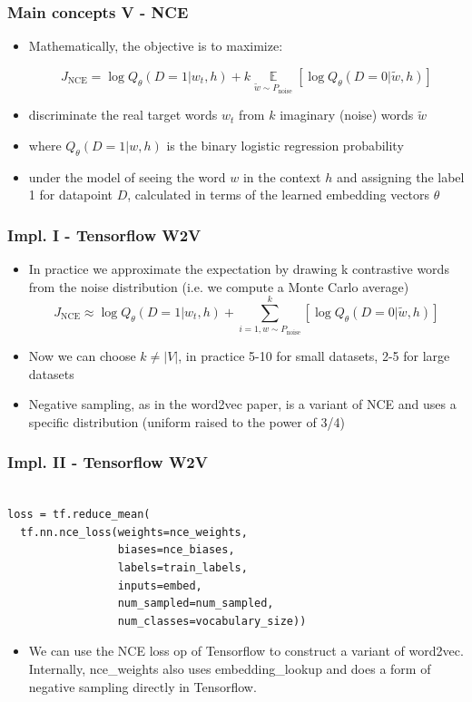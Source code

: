 \documentclass{beamer}
\begin{document}
\begin{frame}
  \frametitle{Main concepts V - NCE}
  
  \begin{itemize}
\item Mathematically, the objective is to maximize:

$$J_\text{NCE} = \log Q_\theta(D=1 |w_t, h) + k \mathop{\mathbb{E}}\limits_{\tilde w \sim P_\text{noise}} \left[ \log Q_\theta(D = 0 |\tilde w, h) \right]$$

\item discriminate the real target words \(w_t\) from \(k\) imaginary (noise) words \(\tilde w\)
\item where $Q_\theta(D=1 | w, h)$ is the binary logistic regression probability
\item under the model of seeing the word $w$ in the context $h$ and assigning the label 1 for datapoint $D$, calculated in terms of the learned embedding vectors $\theta$

\end{itemize}
\end{frame} 

\begin{frame}
  \frametitle{Impl. I - Tensorflow W2V}
    \begin{itemize}
    	\item In practice we approximate the expectation by drawing k contrastive words from the noise distribution (i.e. we compute a Monte Carlo average) 
   $$J_\text{NCE} \approx \log Q_\theta(D=1 |w_t, h) +  \sum_{i=1, w \sim P_\text{noise}}^{k}  \left[ \log Q_\theta(D = 0 |\tilde w, h) \right]$$ 
   \item Now we can choose $k \neq |V|$, in practice 5-10 for small datasets, 2-5 for large datasets
   \item Negative sampling, as in the word2vec paper, is a variant of NCE and uses a specific distribution (uniform raised to the power of 3/4)
   
 \end{itemize}
\end{frame} 

\begin{frame}[fragile]
  \frametitle{Impl. II - Tensorflow W2V}
  \begin{lstlisting}

loss = tf.reduce_mean(
  tf.nn.nce_loss(weights=nce_weights,
                 biases=nce_biases,
                 labels=train_labels,
                 inputs=embed,
                 num_sampled=num_sampled,
                 num_classes=vocabulary_size))
    \end{lstlisting}
    
  \begin{itemize}
  	\item We can use the NCE loss op of Tensorflow to construct a variant of word2vec. Internally, nce\_weights also uses embedding\_lookup and does a form of negative sampling  directly in Tensorflow.
  \end{itemize}
\end{frame}
    
\end{document}
